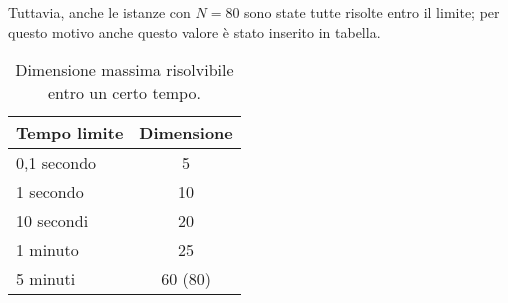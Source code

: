 Tuttavia, anche le istanze con $N=80$ sono state tutte risolte entro il limite; per questo motivo anche questo
valore è stato inserito in tabella.
%
\begin{table}[!h]
	\centering
	\begin{tabular}{l|c}\hline
	\textbf{Tempo limite} & \textbf{Dimensione}  \\ \hline
	0,1 secondo & 5 \\ \hline
	1 secondo & 10  \\ \hline
	10 secondi & 20  \\ \hline
	1 minuto & 25  \\ \hline
	5 minuti & 60 (80)  \\ \hline
	\end{tabular}
	\caption{Dimensione massima risolvibile entro un certo tempo.}
	\label{tab:intervalli-tempo-cplex}
\end{table}
%
